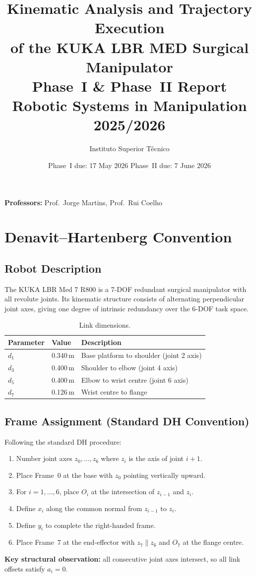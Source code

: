 \documentclass[11pt,a4paper]{article}
\title{\Large Kinematic Analysis and Trajectory Execution\\[4pt]
       of the KUKA LBR MED Surgical Manipulator\\[6pt]
       \large Phase~I \& Phase~II Report\\
       Robotic Systems in Manipulation 2025/2026}
\author{Instituto Superior T\'{e}cnico}
\date{Phase~I due: 17 May 2026 \qquad Phase~II due: 7 June 2026}
\begin{document}
\maketitle
\noindent\textbf{Professors:} Prof.\ Jorge Martins, Prof.\ Rui Coelho
\tableofcontents
\newpage

\section{Denavit--Hartenberg Convention}

\subsection{Robot Description}
The KUKA LBR Med 7 R800 is a 7-DOF redundant surgical manipulator
with all revolute joints. Its kinematic structure consists of alternating
perpendicular joint axes, giving one degree of intrinsic redundancy over
the 6-DOF task space.

\begin{table}[H]
  \centering
  \caption{Link dimensions.}
  \begin{tabular}{lll}
    \toprule
    Parameter & Value & Description \\
    \midrule
    $d_1$ & 0.340\,m & Base platform to shoulder (joint 2 axis) \\
    $d_3$ & 0.400\,m & Shoulder to elbow (joint 4 axis) \\
    $d_5$ & 0.400\,m & Elbow to wrist centre (joint 6 axis) \\
    $d_7$ & 0.126\,m & Wrist centre to flange \\
    \bottomrule
  \end{tabular}
\end{table}

\subsection{Frame Assignment (Standard DH Convention)}
Following the standard DH procedure:
\begin{enumerate}
  \item Number joint axes $z_0,\dots,z_6$ where $z_i$ is the axis of joint $i{+}1$.
  \item Place Frame~0 at the base with $z_0$ pointing vertically upward.
  \item For $i=1,\dots,6$, place $O_i$ at the intersection of $z_{i-1}$ and $z_i$.
  \item Define $x_i$ along the common normal from $z_{i-1}$ to $z_i$.
  \item Define $y_i$ to complete the right-handed frame.
  \item Place Frame~7 at the end-effector with $z_7\!\parallel\! z_6$ and $O_7$ at the flange centre.
\end{enumerate}
\textbf{Key structural observation:} all consecutive joint axes intersect,
so all link offsets satisfy $a_i=0$.
\end{document}
